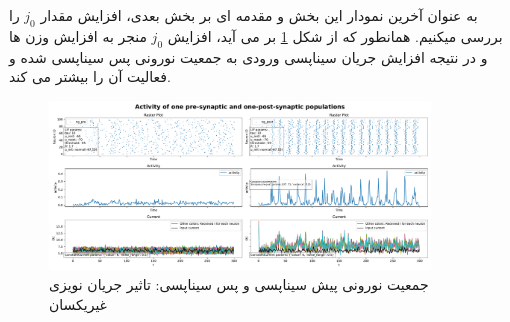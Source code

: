         به عنوان آخرین نمودار این بخش و مقدمه ای بر بخش بعدی، افزایش مقدار 
        $j_0$ 
        را بررسی میکنیم. همانطور که از شکل 
        \ref{fig:part1-two-ng-with-synapse-high-diff-curr-high-j}
        بر می آید، افزایش 
        $j_0$ 
        منجر به افزایش وزن ها و در نتیجه افزایش جریان سیناپسی ورودی به جمعیت نورونی پس سیناپسی شده و فعالیت آن را بیشتر می کند.
        \begin{figure}[!ht]
            \centering
            \includegraphics[width=0.9\textwidth]{plots/part1-two-ng-with-synapse-high-diff-curr-high-j.pdf} 
            \caption{جمعیت نورونی پیش سیناپسی و پس سیناپسی: تاثیر جریان نویزی غیریکسان}
            \label{fig:part1-two-ng-with-synapse-high-diff-curr-high-j}
        \end{figure}


